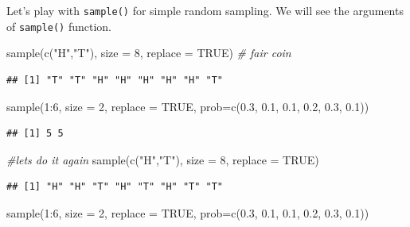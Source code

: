 \documentclass[
]{book}
\newenvironment{Shaded}{\begin{snugshade}}{\end{snugshade}}
\newcommand{\AttributeTok}[1]{\textcolor[rgb]{0.77,0.63,0.00}{#1}}
\newcommand{\CommentTok}[1]{\textcolor[rgb]{0.56,0.35,0.01}{\textit{#1}}}
\newcommand{\ConstantTok}[1]{\textcolor[rgb]{0.00,0.00,0.00}{#1}}
\newcommand{\DecValTok}[1]{\textcolor[rgb]{0.00,0.00,0.81}{#1}}
\newcommand{\FloatTok}[1]{\textcolor[rgb]{0.00,0.00,0.81}{#1}}
\newcommand{\FunctionTok}[1]{\textcolor[rgb]{0.00,0.00,0.00}{#1}}
\newcommand{\NormalTok}[1]{#1}
\newcommand{\SpecialCharTok}[1]{\textcolor[rgb]{0.00,0.00,0.00}{#1}}
\newcommand{\StringTok}[1]{\textcolor[rgb]{0.31,0.60,0.02}{#1}}
\begin{document}
Let's play with \texttt{sample()} for simple random sampling. We will see the arguments of \texttt{sample()} function.

\begin{Shaded}
\begin{Highlighting}[]
\FunctionTok{sample}\NormalTok{(}\FunctionTok{c}\NormalTok{(}\StringTok{"H"}\NormalTok{,}\StringTok{"T"}\NormalTok{), }\AttributeTok{size =} \DecValTok{8}\NormalTok{, }\AttributeTok{replace =} \ConstantTok{TRUE}\NormalTok{)  }\CommentTok{\# fair coin}
\end{Highlighting}
\end{Shaded}

\begin{verbatim}
## [1] "T" "T" "H" "H" "H" "H" "H" "T"
\end{verbatim}

\begin{Shaded}
\begin{Highlighting}[]
\FunctionTok{sample}\NormalTok{(}\DecValTok{1}\SpecialCharTok{:}\DecValTok{6}\NormalTok{, }\AttributeTok{size =} \DecValTok{2}\NormalTok{, }\AttributeTok{replace =} \ConstantTok{TRUE}\NormalTok{, }\AttributeTok{prob=}\FunctionTok{c}\NormalTok{(}\FloatTok{0.3}\NormalTok{, }\FloatTok{0.1}\NormalTok{, }\FloatTok{0.1}\NormalTok{, }\FloatTok{0.2}\NormalTok{, }\FloatTok{0.3}\NormalTok{, }\FloatTok{0.1}\NormalTok{))}
\end{Highlighting}
\end{Shaded}

\begin{verbatim}
## [1] 5 5
\end{verbatim}

\begin{Shaded}
\begin{Highlighting}[]
\CommentTok{\#let\textquotesingle{}s do it again}
\FunctionTok{sample}\NormalTok{(}\FunctionTok{c}\NormalTok{(}\StringTok{"H"}\NormalTok{,}\StringTok{"T"}\NormalTok{), }\AttributeTok{size =} \DecValTok{8}\NormalTok{, }\AttributeTok{replace =} \ConstantTok{TRUE}\NormalTok{)  }
\end{Highlighting}
\end{Shaded}

\begin{verbatim}
## [1] "H" "H" "T" "H" "T" "H" "T" "T"
\end{verbatim}

\begin{Shaded}
\begin{Highlighting}[]
\FunctionTok{sample}\NormalTok{(}\DecValTok{1}\SpecialCharTok{:}\DecValTok{6}\NormalTok{, }\AttributeTok{size =} \DecValTok{2}\NormalTok{, }\AttributeTok{replace =} \ConstantTok{TRUE}\NormalTok{, }\AttributeTok{prob=}\FunctionTok{c}\NormalTok{(}\FloatTok{0.3}\NormalTok{, }\FloatTok{0.1}\NormalTok{, }\FloatTok{0.1}\NormalTok{, }\FloatTok{0.2}\NormalTok{, }\FloatTok{0.3}\NormalTok{, }\FloatTok{0.1}\NormalTok{))}
\end{Highlighting}
\end{Shaded}
\end{document}
